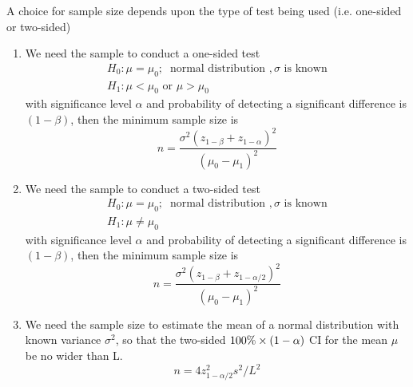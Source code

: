 A choice for sample size depends upon the type of test being used
(i.e. one-sided or two-sided)
\begin{enumerate}
\item We need the sample to conduct a one-sided test 
  \begin{equation*}
    \begin{split}
      H_0: \mu = \mu_0;\;\; \text{normal distribution }, \sigma \text{ is known}\\
      H_1: \mu < \mu_0  \text{ or } \mu > \mu_0
    \end{split}
  \end{equation*}
  with significance level $\alpha$ and probability of detecting a
  significant difference is $(1-\beta)$, then the minimum sample size
  is
  \begin{equation}
    \label{eq:73}
    n = \frac{\sigma^2(z_{1-\beta}+z_{1-\alpha})^2}{(\mu_0-\mu_1)^2}
  \end{equation}
\item We need the sample to conduct a two-sided test 
  \begin{equation*}
    \begin{split}
      H_0: \mu = \mu_0;\;\; \text{normal distribution }, \sigma \text{ is known}\\
      H_1: \mu \ne \mu_0     
    \end{split}
  \end{equation*}
  with significance level $\alpha$ and probability of detecting a
  significant difference is $(1-\beta)$, then the minimum sample size
  is
  \begin{equation}
    \label{eq:74}
    n = \frac{\sigma^2(z_{1-\beta}+z_{1-\alpha/2})^2}{(\mu_0-\mu_1)^2}
  \end{equation}

\item We need the sample size to estimate the mean of a normal
  distribution with known variance $\sigma^2$, so that the two-sided
  $100\%\times (1-\alpha)$ CI for the mean $\mu$ be no wider than L.
  \begin{equation}
    \label{eq:74}
    n = 4 z^2_{1-\alpha/2} s^2/L^2
  \end{equation}
\end{enumerate}




